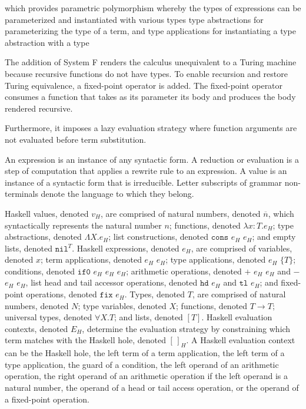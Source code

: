 which provides parametric polymorphism whereby the types of expressions can be parameterized and instantiated with various types type abstractions for parameterizing the type of a term, and type applications for instantiating a type abstraction with a type

The addition of System F renders the calculus unequivalent to a Turing machine because recursive functions do not have types.  To enable recursion and restore Turing equivalence, a fixed-point operator is added.  The fixed-point operator consumes a function that takes as its parameter its body and produces the body rendered recursive.



Furthermore, it imposes a lazy evaluation strategy where function arguments are not evaluated before term substitution.

An expression is an instance of any syntactic form.  A reduction or evaluation is a step of computation that applies a rewrite rule to an expression.  A value is an instance of a syntactic form that is irreducible.  Letter subscripts of grammar non-terminals denote the language to which they belong.

Haskell values, denoted $v_{H}$, are comprised of natural numbers, denoted $\overline{n}$, which syntactically represents the natural number $n$; functions, denoted $\lambda x:T.e_{H}$; type abstractions, denoted $\Lambda X.e_{H}$; list constructions, denoted $\mathtt{cons}$ $e_{H}$ $e_{H}$; and empty lists, denoted $\mathtt{nil}^{T}$.  Haskell expressions, denoted $e_{H}$, are comprised of variables, denoted $x$; term applications, denoted $e_{H}$ $e_{H}$; type applications, denoted $e_{H}$ $\lbrace T\rbrace$; conditions, denoted $\mathtt{if0}$ $e_{H}$ $e_{H}$ $e_{H}$; arithmetic operations, denoted $+$ $e_{H}$ $e_{H}$ and $-$ $e_{H}$ $e_{H}$, list head and tail accessor operations, denoted $\mathtt{hd}$ $e_{H}$ and $\mathtt{tl}$ $e_{H}$; and fixed-point operations, denoted $\mathtt{fix}$ $e_{H}$.  Types, denoted $T$, are comprised of natural numbers, denoted $N$; type variables, denoted $X$; functions, denoted $T\rightarrow T$; universal types, denoted $\forall X.T$; and lists, denoted $[T]$.  Haskell evaluation contexts, denoted $E_{H}$, determine the evaluation strategy by constraining which term matches with the Haskell hole, denoted $[\,]_{H}$.  A Haskell evaluation context can be the Haskell hole, the left term of a term application, the left term of a type application, the guard of a condition, the left operand of an arithmetic operation, the right operand of an arithmetic operation if the left operand is a natural number, the operand of a head or tail access operation, or the operand of a fixed-point operation.

